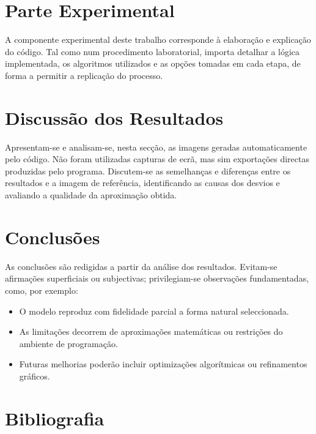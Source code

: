 \documentclass[12pt,a4paper,oneside]{extarticle}
\begin{document}
\section{Parte Experimental}
A componente experimental deste trabalho corresponde à elaboração e explicação do código\cite{carvalho2021praticas}.  
Tal como num procedimento laboratorial, importa detalhar a lógica implementada\cite{martins2015programacao}, os algoritmos utilizados e as opções tomadas em cada etapa, de forma a permitir a replicação do processo.  



\section{Discussão dos Resultados}
Apresentam-se e analisam-se, nesta secção, as imagens geradas automaticamente pelo código.  
Não foram utilizadas capturas de ecrã, mas sim exportações directas produzidas pelo programa.  
Discutem-se as semelhanças e diferenças entre os resultados e a imagem de referência, identificando as causas dos desvios e avaliando a qualidade da aproximação obtida.  

\section{Conclusões}
As conclusões são redigidas a partir da análise dos resultados.  
Evitam-se afirmações superficiais ou subjectivas; privilegiam-se observações fundamentadas, como, por exemplo:  
\begin{itemize}
    \item O modelo reproduz com fidelidade parcial a forma natural seleccionada.  
    \item As limitações decorrem de aproximações matemáticas ou restrições do ambiente de programação.  
    \item Futuras melhorias poderão incluir optimizações algorítmicas ou refinamentos gráficos.  
\end{itemize}

\section{Bibliografia}
\printbibliography


\label{fim}
\end{document}
